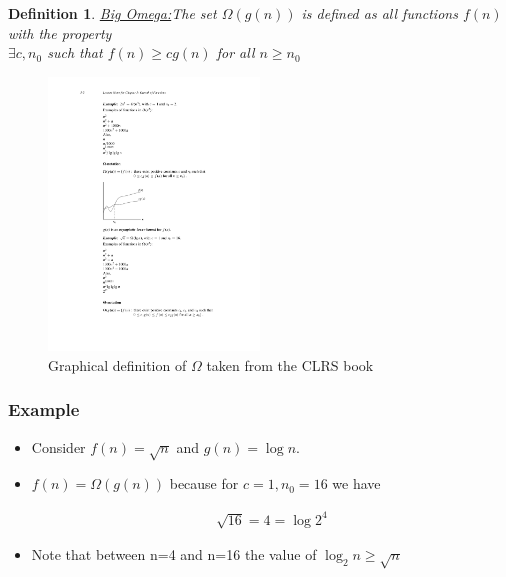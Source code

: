 \documentclass{beamer}
\newtheorem{mydef}{Definition}
\newcommand{\emphasis}[1]{\ul{#1}}
\begin{document}
\begin{frame}
  
\begin{mydef}
\emphasis{Big Omega:}The set $\Omega(g(n))$ is defined as all functions $f(n)$ with the property\\
$\exists c,n_0$ such that $ f(n)\ge c g(n)$ for all $n\ge n_0$
\end{mydef}
\begin{figure}[h]
  \centering
  \includegraphics[width=0.5\textwidth]{complexity-figs/Big-Omega.pdf}
\caption{Graphical definition of $\Omega$ taken from the CLRS book}
\end{figure}
\end{frame}

\begin{frame}
  \frametitle{Example}
  \begin{itemize}
  \item Consider $f(n)=\sqrt{n}$ and $g(n)=\log n$.
\item $f(n)=\Omega(g(n))$ because for $c=1,n_0=16$ we have

  \begin{align*}
    \sqrt{16}=4=\log 2^4
  \end{align*}

\item Note that between n=4 and n=16 the value of $\log_2 n\ge \sqrt{n}$
  \end{itemize}
\end{frame}
\end{document}
